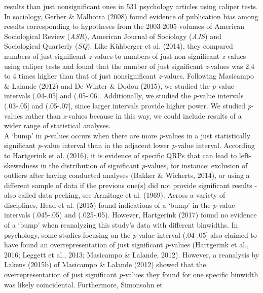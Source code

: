 \documentclass[
  12pt,
]{article}
\begin{document}
results than just nonsignificant ones in 531 psychology articles using
caliper tests. In sociology, Gerber \& Malhotra (2008) found evidence of
publication bias among results corresponding to hypotheses from the
2003-2005 volumes of American Sociological Review (\emph{ASR}), American
Journal of Sociology (\emph{AJS}) and Sociological Quarterly
(\emph{SQ}). Like Kühberger et al. (2014), they compared numbers of just
significant \emph{z}-values to numbers of just non-significant
\emph{z}-values using caliper tests and found that the number of just
significant \emph{z}-values was 2.4 to 4 times higher than that of just
nonsignificant \emph{z}-values. Following Masicampo \& Lalande (2012)
and De Winter \& Dodou (2015), we studied the \emph{p}-value intervals
(.04-.05{]} and (.05-.06{]}. Additionally, we studied the \emph{p}-value
intervals (.03-.05{]} and (.05-.07{]}, since larger intervals provide
higher power. We studied \emph{p}-values rather than \emph{z}-values
because in this way, we could include results of a wider range of
statistical analyses.\\
\hspace*{0.333em}\hspace*{0.333em}\hspace*{0.333em}\hspace*{0.333em}A
`bump' in \emph{p}-values occurs when there are more \emph{p}-values in
a just statistically significant \emph{p}-value interval than in the
adjacent lower \emph{p}-value interval. According to Hartgerink et al.
(2016), it is evidence of specific QRPs that can lead to left-skewedness
in the distribution of significant \emph{p}-values, for instance:
exclusion of outliers after having conducted analyses (Bakker \&
Wicherts, 2014), or using a different sample of data if the previous
one(s) did not provide significant results - also called data peeking,
see Armitage et al. (1969). Across a variety of disciplines, Head et al.
(2015) found indications of a `bump' in the \emph{p}-value intervals
(.045-.05) and (.025-.05). However, Hartgerink (2017) found no evidence
of a `bump' when reanalyzing this study's data with different binwidths.
In psychology, some studies focusing on the \emph{p}-value interval
(.04-.05{]} also claimed to have found an overrepresentation of just
significant \emph{p}-values (Hartgerink et al., 2016; Leggett et al.,
2013; Masicampo \& Lalande, 2012). However, a reanalysis by Lakens
(2015b) of Masicampo \& Lalande (2012) showed that the
overrepresentation of just significant \emph{p}-values they found for
one specific binwidth was likely coincidental. Furthermore, Simonsohn et
\end{document}
